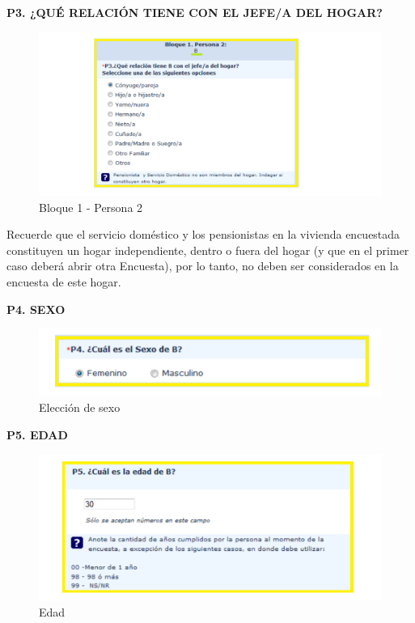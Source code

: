 \documentclass[
  openany]{book}
\begin{document}
\textbf{P3. ¿QUÉ RELACIÓN TIENE CON EL JEFE/A DEL HOGAR?}

\begin{figure}

{\centering \includegraphics[width=1\linewidth]{imagenes/figura6-50} 

}

\caption{Bloque 1 - Persona 2}\label{fig:bloque1a}
\end{figure}

Recuerde que el servicio doméstico y los pensionistas en la vivienda encuestada constituyen un hogar independiente, dentro o fuera del hogar (y que en el primer caso deberá abrir otra Encuesta), por lo tanto, no deben ser considerados en la encuesta de este hogar.

\textbf{P4. SEXO}

\begin{figure}

{\centering \includegraphics[width=1\linewidth]{imagenes/figura6-51} 

}

\caption{Elección de sexo}\label{fig:sexo}
\end{figure}

\textbf{P5. EDAD}

\begin{figure}

{\centering \includegraphics[width=1\linewidth]{imagenes/figura6-52} 

}

\caption{Edad}\label{fig:edad1}
\end{figure}
\end{document}
